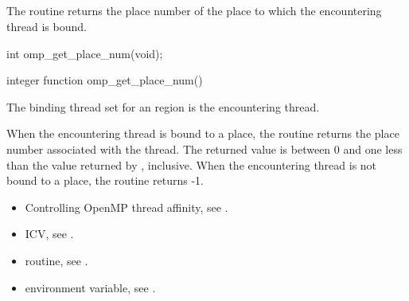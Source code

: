 \subsection{}
\label{subsec:omp_get_place_num}

\summary
The  routine returns the place number of the place to which the encountering thread is bound.

\format
\begin{ccppspecific}
\begin{ompcFunction}
int omp_get_place_num(void);
\end{ompcFunction}
\end{ccppspecific}

\begin{fortranspecific}
\begin{ompfFunction}
integer function omp_get_place_num()
\end{ompfFunction}
\end{fortranspecific}

\binding
The binding thread set for an  region is the encountering thread.

\effect
When the encountering thread is bound to a place, the
 routine returns the place number associated
with the thread. The returned value is between 0 and one less than the
value returned by , inclusive. When the
encountering thread is not bound to a place, the routine returns -1.

\crossreferences
\begin{itemize}
\item Controlling OpenMP thread affinity, see
.

\item {} ICV, see
.

\item {} routine, see
.

\item {} environment variable, see
.
\end{itemize}





\subsection{}
\label{subsec:omp_get_partition_num_places}

